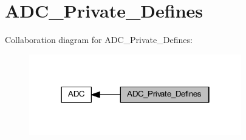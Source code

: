 \hypertarget{group___a_d_c___private___defines}{}\section{A\+D\+C\+\_\+\+Private\+\_\+\+Defines}
\label{group___a_d_c___private___defines}
Collaboration diagram for A\+D\+C\+\_\+\+Private\+\_\+\+Defines\+:
\nopagebreak
\begin{figure}[H]
\begin{center}
\leavevmode
\includegraphics[width=262pt]{group___a_d_c___private___defines}
\end{center}
\end{figure}
